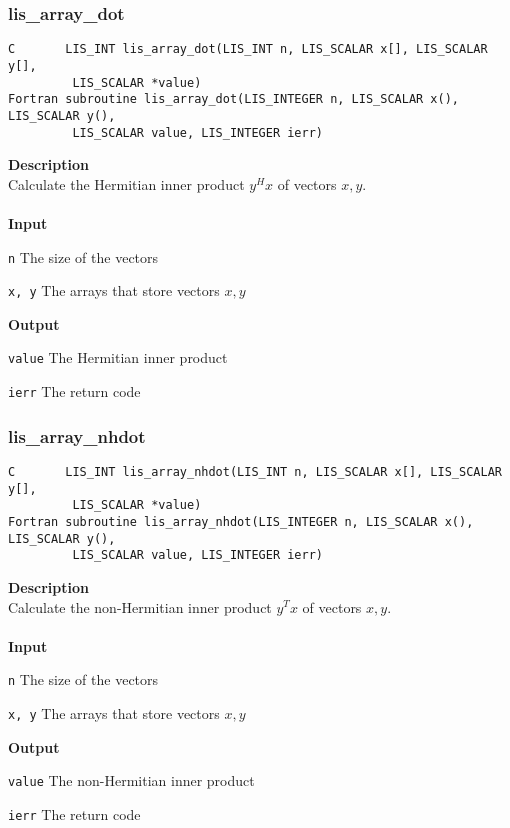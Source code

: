 \documentclass[a4paper]{article}
\newcommand{\namelistlabel}[1]{\mbox{#1}\hfill}
\newenvironment{namelist}[1]{%
\begin{list}{}
  {\let\makelabel\namelistlabel
  \settowidth{\labelwidth}{#1}
  \setlength{\leftmargin}{1.1\labelwidth}}
  }{%
\end{list}}
\begin{document}
\subsubsection{lis\_array\_dot}
\begin{screen}
\verb|C       LIS_INT lis_array_dot(LIS_INT n, LIS_SCALAR x[], LIS_SCALAR y[],|\\
\verb|         LIS_SCALAR *value)|\\
\verb|Fortran subroutine lis_array_dot(LIS_INTEGER n, LIS_SCALAR x(), LIS_SCALAR y(),|\\
\verb|         LIS_SCALAR value, LIS_INTEGER ierr)|
\end{screen}
{\bf Description}\\
\indent
Calculate the Hermitian inner product $y^{H}x$ of vectors $x, y$.
\\ \\
\noindent
{\bf Input}
\begin{namelist}{XXXXXXXXXXXXXXXXXXXX}
\item[\tt n] The size of the vectors  
\item[\tt x, y] The arrays that store vectors $x, y$
\end{namelist}
{\bf Output}
\begin{namelist}{XXXXXXXXXXXXXXXXXXXX}
\item[\tt value] The Hermitian inner product
\item[\tt ierr] The return code
\end{namelist}

\newpage
\subsubsection{lis\_array\_nhdot}
\begin{screen}
\verb|C       LIS_INT lis_array_nhdot(LIS_INT n, LIS_SCALAR x[], LIS_SCALAR y[],|\\
\verb|         LIS_SCALAR *value)|\\
\verb|Fortran subroutine lis_array_nhdot(LIS_INTEGER n, LIS_SCALAR x(), LIS_SCALAR y(),|\\
\verb|         LIS_SCALAR value, LIS_INTEGER ierr)|
\end{screen}
{\bf Description}\\
\indent
Calculate the non-Hermitian inner product $y^{T}x$ of vectors $x, y$.
\\ \\
\noindent
{\bf Input}
\begin{namelist}{XXXXXXXXXXXXXXXXXXXX}
\item[\tt n] The size of the vectors  
\item[\tt x, y] The arrays that store vectors $x, y$
\end{namelist}
{\bf Output}
\begin{namelist}{XXXXXXXXXXXXXXXXXXXX}
\item[\tt value] The non-Hermitian inner product
\item[\tt ierr] The return code
\end{namelist}
\end{document}
